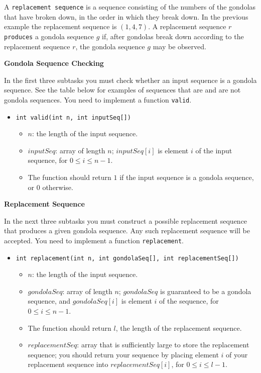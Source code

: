 A \texttt{replacement sequence} is a sequence consisting of the numbers of the gondolas that have broken down, in the order in which they break down. In the previous example the replacement sequence is $(1, 4, 7)$. A replacement sequence $r$ \texttt{produces} a gondola sequence $g$ if, after gondolas break down according to the replacement sequence $r$, the gondola sequence $g$ may be observed.


\textbf{Gondola Sequence Checking}

In the first three subtasks you must check whether an input sequence is a gondola sequence. See the table below for examples of sequences that are and are not gondola sequences. You need to implement a function \texttt{valid}.

\begin{itemize}
\item \texttt{int valid(int n, int inputSeq[])}
\begin{itemize}
\item $n$: the length of the input sequence.
\item $inputSeq$: array of length $n$; $inputSeq[i]$ is element $i$ of the input sequence, for $0 \le i \le n - 1$.
\item The function should return $1$ if the input sequence is a gondola sequence, or $0$ otherwise.
\end{itemize}
\end{itemize}

\textbf{Replacement Sequence}

In the next three subtasks you must construct a possible replacement sequence that produces a given gondola sequence. Any such replacement sequence will be accepted. You need to implement a function \texttt{replacement}.

\begin{itemize}
\item \texttt{int replacement(int n, int gondolaSeq[], int replacementSeq[])}
\begin{itemize}
\item $n$: the length of the input sequence.
\item $gondolaSeq$: array of length $n$; $gondolaSeq$ is guaranteed to be a gondola sequence, and $gondolaSeq[i]$ is element $i$ of the sequence, for $0 \le i \le n - 1$.
\item The function should return $l$, the length of the replacement sequence.
\item $replacementSeq$: array that is sufficiently large to store the replacement sequence; you should return your sequence by placing element $i$ of your replacement sequence into $replacementSeq[i]$, for $0 \le i \le l - 1$.
\end{itemize}
\end{itemize}

